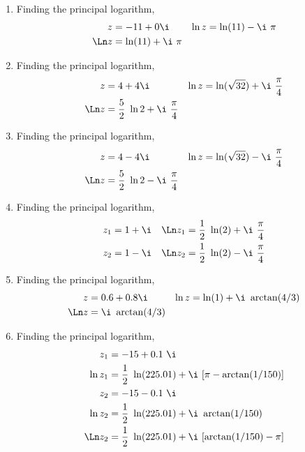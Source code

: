 \begin{enumerate}
    \item Finding the principal logarithm,
          \begin{align}
              z     & = -11 + 0\i         &
              \ln z & = \ln(11) - \i\ \pi   \\
              \Ln z & = \ln(11) + \i\ \pi
          \end{align}

    \item Finding the principal logarithm,
          \begin{align}
              z     & = 4 + 4\i                                &
              \ln z & = \ln(\sqrt{32}) + \i\ \frac{\pi}{4}       \\
              \Ln z & = \frac{5}{2}\ \ln 2 + \i\ \frac{\pi}{4}
          \end{align}

    \item Finding the principal logarithm,
          \begin{align}
              z     & = 4 - 4\i                                &
              \ln z & = \ln(\sqrt{32}) - \i\ \frac{\pi}{4}       \\
              \Ln z & = \frac{5}{2}\ \ln 2 - \i\ \frac{\pi}{4}
          \end{align}

    \item Finding the principal logarithm,
          \begin{align}
              z_1     & = 1 + \i                                  &
              \Ln z_1 & = \frac{1}{2}\ \ln(2) + \i\ \frac{\pi}{4}   \\
              z_2     & = 1 - \i                                  &
              \Ln z_2 & = \frac{1}{2}\ \ln(2) - \i\ \frac{\pi}{4}   \\
          \end{align}

    \item Finding the principal logarithm,
          \begin{align}
              z     & = 0.6 + 0.8\i               &
              \ln z & = \ln(1) + \i\ \arctan(4/3)   \\
              \Ln z & = \i\ \arctan(4/3)
          \end{align}

    \item Finding the principal logarithm,
          \begin{align}
              z_1     & = -15 + 0.1\ \i                                         \\
              \ln z_1 & = \frac{1}{2}\ \ln(225.01) + \i\ [\pi - \arctan(1/150)] \\
              z_2     & = -15 - 0.1\ \i                                         \\
              \ln z_2 & = \frac{1}{2}\ \ln(225.01) + \i\ \arctan(1/150)         \\
              \Ln z_2 & = \frac{1}{2}\ \ln(225.01) + \i\ [\arctan(1/150) - \pi]
          \end{align}


\end{enumerate}
